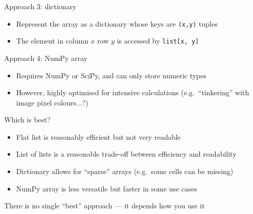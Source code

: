 \begin{frame}{Approach 3: dictionary}
	\begin{itemize}
		\pause\item Represent the array as a dictionary whose keys are \lstinline{(x,y)} tuples
		\pause\item The element in column $x$ row $y$ is accessed by \lstinline{list[x, y]}
	\end{itemize}
\end{frame}

\begin{frame}{Approach 4: NumPy array}
	\begin{itemize}
		\pause\item Requires NumPy or SciPy, and can only store numeric types
		\pause\item However, highly optimised for intensive calculations
			(e.g.\ ``tinkering'' with image pixel colours...?)
	\end{itemize}
\end{frame}

\begin{frame}{Which is best?}
	\begin{itemize}
		\pause\item Flat list is reasonably efficient but not very readable
		\pause\item List of lists is a reasonable trade-off between efficiency and readability
		\pause\item Dictionary allows for ``sparse'' arrays (e.g.\ some cells can be missing)
		\pause\item NumPy array is less versatile but faster in some use cases
	\end{itemize}
	\pause There is no single ``best'' approach --- it depends how you use it
\end{frame}
